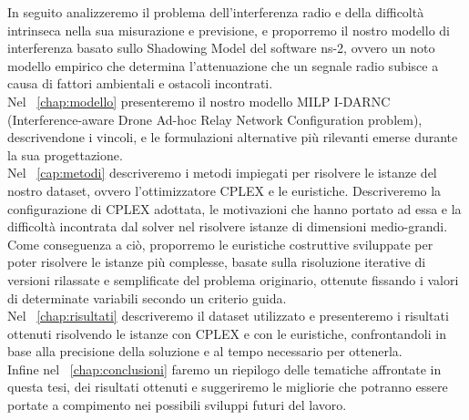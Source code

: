 In seguito analizzeremo il problema dell'interferenza radio e della difficoltà intrinseca nella sua misurazione e previsione, e proporremo il nostro modello di interferenza basato sullo Shadowing Model del software ns-2, ovvero un noto modello empirico che determina l'attenuazione che un segnale radio subisce a causa di fattori ambientali e ostacoli incontrati. \\
Nel \chaptername\ \ref{chap:modello} presenteremo il nostro modello MILP I-DARNC (Interference-aware Drone Ad-hoc Relay Network Configuration problem), descrivendone i vincoli, e le formulazioni alternative più rilevanti emerse durante la sua progettazione. \\
Nel \chaptername\ \ref{cap:metodi} descriveremo i metodi impiegati per risolvere le istanze del nostro dataset, ovvero l'ottimizzatore CPLEX e le euristiche. 
Descriveremo la configurazione di CPLEX adottata, le motivazioni che hanno portato ad essa e la difficoltà incontrata dal solver nel risolvere istanze di dimensioni medio-grandi. 
Come conseguenza a ciò, proporremo le euristiche costruttive sviluppate per poter risolvere le istanze più complesse, basate sulla risoluzione iterative di versioni rilassate e semplificate del problema originario, ottenute fissando i valori di determinate variabili secondo un criterio guida. \\
Nel \chaptername\ \ref{chap:risultati} descriveremo il dataset utilizzato e presenteremo i risultati ottenuti risolvendo le istanze con CPLEX e con le euristiche, confrontandoli in base alla precisione della soluzione e al tempo necessario per ottenerla.\\
Infine nel \chaptername\ \ref{chap:conclusioni} faremo un riepilogo delle tematiche affrontate in questa tesi, dei risultati ottenuti e suggeriremo le migliorie che potranno essere portate a compimento nei possibili sviluppi futuri del lavoro. \\

